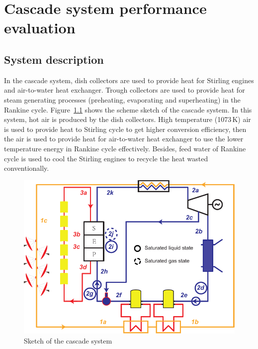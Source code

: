 \chapter{Cascade system performance evaluation}
\section{System description}
In the cascade system, dish collectors are used to provide heat for Stirling engines and air-to-water heat exchanger. Trough collectors are used to provide heat for steam generating processes (preheating, evaporating and superheating) in the Rankine cycle. Figure~\ref{fig:System-1} shows the scheme sketch of the cascade system. In this system, hot air is produced by the dish collectors. High temperature (1073\,K) air is used to provide heat to Stirling cycle to get higher conversion efficiency, then the air is used to provide heat for air-to-water heat exchanger to use the lower temperature energy in Rankine cycle effectively. Besides, feed water of Rankine cycle is used to cool the Stirling engines to recycle the heat wasted conventionally. 

\noindent \begin{figure}[htbp]
\begin{center}
	\includegraphics[width = 0.8\columnwidth]{fig/cascadeSystem}
	\caption{Sketch of the cascade system}
	\label{fig:System-1}
\end{center}
\end{figure}

